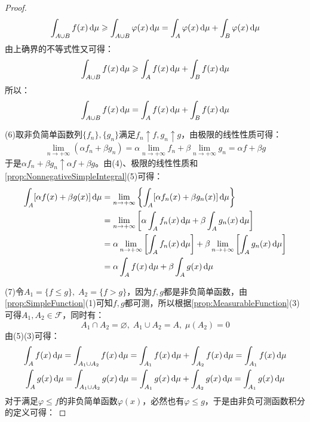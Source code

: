 \begin{proof}
\begin{equation*}
		\int_{A\cup B}f(x)\mathop{}\!\mathrm{d}\mu\geqslant\int_{A\cup B}\varphi(x)\mathop{}\!\mathrm{d}\mu=\int_{A}\varphi(x)\mathop{}\!\mathrm{d}\mu+\int_{B}\varphi(x)\mathop{}\!\mathrm{d}\mu
	\end{equation*}
	由上确界的不等式性又可得：
	\begin{equation*}
		\int_{A\cup B}f(x)\mathop{}\!\mathrm{d}\mu\geqslant\int_{A}f(x)\mathop{}\!\mathrm{d}\mu+\int_{B}f(x)\mathop{}\!\mathrm{d}\mu
	\end{equation*}
	所以：
	\begin{equation*}
		\int_{A\cup B}f(x)\mathop{}\!\mathrm{d}\mu=\int_{A}f(x)\mathop{}\!\mathrm{d}\mu+\int_{B}f(x)\mathop{}\!\mathrm{d}\mu
	\end{equation*}\par
	(6)取非负简单函数列$\{f_n\},\{g_n\}$满足$f_n\uparrow f,g_n\uparrow g$，由极限的线性性质可得：
	\begin{equation*}
		\lim_{n\to+\infty}(\alpha f_n+\beta g_n)=\alpha\lim_{n\to+\infty}f_n+\beta\lim_{n\to+\infty}g_n=\alpha f+\beta g
	\end{equation*}
	于是$\alpha f_n+\beta g_n\uparrow\alpha f+\beta g$。由(4)、极限的线性性质和\cref{prop:NonnegativeSimpleIntegral}(5)可得：
	\begin{align*}
		\int_{A}^{}[\alpha f(x)+\beta g(x)]\dif\mu
		&=\lim_{n\to+\infty}\left\{\int_{A}^{}[\alpha f_n(x)+\beta g_n(x)]\dif\mu\right\} \\
		&=\lim_{n\to+\infty}\left[\alpha\int_{A}^{}f_n(x)\dif\mu+\beta\int_{A}^{}g_n(x)\dif\mu\right] \\
		&=\alpha\lim_{n\to+\infty}\left[\int_{A}^{}f_n(x)\dif\mu\right]+\beta\lim_{n\to+\infty}\left[\int_{A}^{}g_n(x)\dif\mu\right] \\
		&=\alpha\int_{A}^{}f(x)\dif\mu+\beta\int_{A}^{}g(x)\dif\mu
	\end{align*}\par
	(7)令$A_1=\{f\leqslant g\},\;A_2=\{f>g\}$，因为$f,g$都是非负简单函数，由\cref{prop:SimpleFunction}(1)可知$f,g$都可测，所以根据\cref{prop:MeasurableFunction}(3)可得$A_1,A_2\in \mathscr{F}$，同时有：
	\begin{equation*}
		A_1\cap A_2=\varnothing,\;A_1\cup A_2=A,\;\mu(A_2)=0
	\end{equation*}
	由(5)(3)可得：
	\begin{gather*}
		\int_{A}f(x)\dif\mu=\int_{A_1\cup A_2}f(x)\dif\mu=\int_{A_1}f(x)\dif\mu+\int_{A_2}f(x)\dif\mu=\int_{A_1}f(x)\dif\mu \\
		\int_{A}g(x)\dif\mu=\int_{A_1\cup A_2}g(x)\dif\mu=\int_{A_1}g(x)\dif\mu+\int_{A_2}g(x)\dif\mu=\int_{A_1}g(x)\dif\mu
	\end{gather*}
	对于满足$\varphi\leqslant f$的非负简单函数$\varphi(x)$，必然也有$\varphi\leqslant g$，于是由非负可测函数积分的定义可得：

\end{proof}
